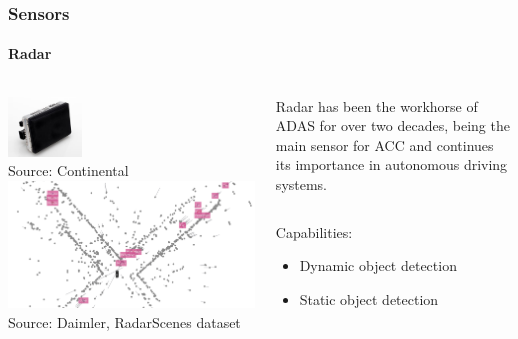 \begin{frame}
\frametitle{Sensors}
\framesubtitle{Radar}
\begin{columns}[T]
    \begin{column}{.4\textwidth}
        \centering
        \includegraphics[width=0.3\textwidth]{images/continental_radar.jpg}\\
        \vspace{0.1cm}
        \tiny{Source: Continental\footnotemark[1]}\\
        \vspace{0.3cm}
        \includegraphics[width=\textwidth]{images/daimler_radar_dataset.png}\\
        \tiny{Source: Daimler, RadarScenes dataset\footnotemark[2]}
    \end{column}
    \begin{column}{.6\textwidth}
        \footnotesize
        Radar has been the workhorse of ADAS for over two decades, being the main
        sensor for ACC and continues its importance in autonomous driving systems.
        \vspace{0.2cm}
        \begin{columns}[T]
            \begin{column}{0.4\textwidth}
                \footnotesize
                Capabilities:
                \begin{itemize}
                    \item Dynamic object detection
                    \item Static object detection

\end{itemize}
\end{column}
\end{columns}
\end{column}
\end{columns}
\end{frame}
